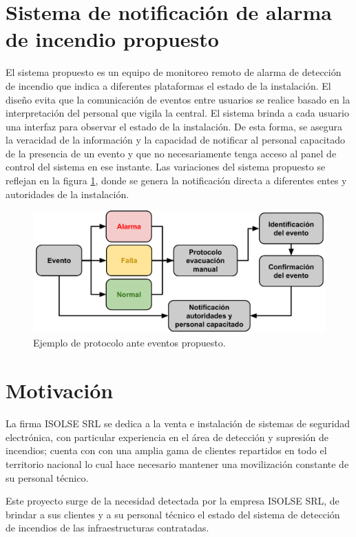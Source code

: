 \section{Sistema de notificación de alarma de incendio propuesto}

El sistema propuesto es un equipo de monitoreo remoto de alarma de detección de incendio que indica a diferentes plataformas el estado de la instalación. El diseño evita que la comunicación de eventos entre usuarios se realice basado en la interpretación del personal que vigila la central. El sistema brinda a cada usuario  una interfaz para observar el estado de la instalación. De esta forma, se asegura la veracidad de la información y la capacidad de notificar al personal capacitado de la presencia de un evento y que no necesariamente tenga acceso al panel de control del sistema en ese instante. Las variaciones del sistema propuesto se reflejan en la figura \ref{fig:figura_a3}, donde se genera la notificación directa a diferentes entes y autoridades de la instalación.  

\begin{figure}[h]
	\centering
	\includegraphics[scale=.35]{./Figures/Capitulo1/FIG_C1.png}
	\caption{Ejemplo de protocolo ante eventos propuesto.}
	\label{fig:figura_a3}
\end{figure}

\section{Motivación}

La firma ISOLSE SRL se dedica a la venta e instalación de sistemas de seguridad electrónica, con particular experiencia en el área de detección y supresión de incendios; cuenta con con una amplia gama de clientes repartidos en todo el territorio nacional lo cual hace necesario mantener una movilización constante de su personal técnico. 

Este proyecto surge de la necesidad detectada por la empresa ISOLSE SRL, de brindar a sus clientes y a su personal técnico el estado del sistema de detección de incendios de las infraestructuras contratadas.

